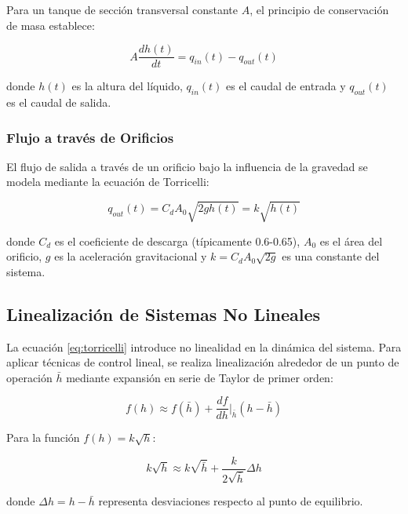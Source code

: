 \documentclass[conference]{IEEEtran}
\begin{document}
Para un tanque de sección transversal constante $A$, el principio de conservación de masa establece:

\begin{equation}
A\frac{dh(t)}{dt} = q_{in}(t) - q_{out}(t)
\label{eq:balance_masa}
\end{equation}

donde $h(t)$ es la altura del líquido, $q_{in}(t)$ es el caudal de entrada y $q_{out}(t)$ es el caudal de salida.

\subsubsection{Flujo a través de Orificios}

El flujo de salida a través de un orificio bajo la influencia de la gravedad se modela mediante la ecuación de Torricelli:

\begin{equation}
q_{out}(t) = C_d A_0 \sqrt{2gh(t)} = k\sqrt{h(t)}
\label{eq:torricelli}
\end{equation}

donde $C_d$ es el coeficiente de descarga (típicamente 0.6-0.65), $A_0$ es el área del orificio, $g$ es la aceleración gravitacional y $k = C_d A_0 \sqrt{2g}$ es una constante del sistema.

\subsection{Linealización de Sistemas No Lineales}

La ecuación \eqref{eq:torricelli} introduce no linealidad en la dinámica del sistema. Para aplicar técnicas de control lineal, se realiza linealización alrededor de un punto de operación $\bar{h}$ mediante expansión en serie de Taylor de primer orden:

\begin{equation}
f(h) \approx f(\bar{h}) + \frac{df}{dh}\bigg|_{\bar{h}}(h - \bar{h})
\end{equation}

Para la función $f(h) = k\sqrt{h}$:

\begin{equation}
k\sqrt{h} \approx k\sqrt{\bar{h}} + \frac{k}{2\sqrt{\bar{h}}}\Delta h
\label{eq:linealizacion}
\end{equation}

donde $\Delta h = h - \bar{h}$ representa desviaciones respecto al punto de equilibrio.
\end{document}
